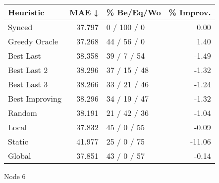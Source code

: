 \begin{tabular}{lrlr}
\toprule
\textbf{Heuristic} & \textbf{MAE ↓} & \textbf{\% Be/Eq/Wo} & \textbf{\% Improv.} \\
\midrule
            Synced &         37.797 &          0 / 100 / 0 &                0.00 \\
     Greedy Oracle &         37.268 &          44 / 56 / 0 &                1.40 \\
         Best Last &         38.358 &          39 / 7 / 54 &               -1.49 \\
       Best Last 2 &         38.296 &         37 / 15 / 48 &               -1.32 \\
       Best Last 3 &         38.266 &         33 / 21 / 46 &               -1.24 \\
    Best Improving &         38.296 &         34 / 19 / 47 &               -1.32 \\
            Random &         38.191 &         21 / 42 / 36 &               -1.04 \\
             Local &         37.832 &          45 / 0 / 55 &               -0.09 \\
            Static &         41.977 &          25 / 0 / 75 &              -11.06 \\
            Global &         37.851 &          43 / 0 / 57 &               -0.14 \\
\bottomrule
\end{tabular}
\caption{Node 6}
\label{tab:non_lr05_le2_bs4_6}
